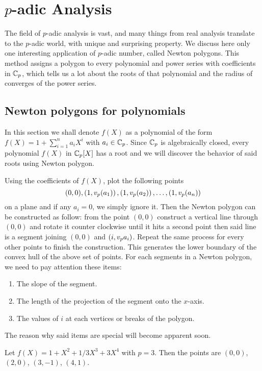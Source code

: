 \chapter{$p$-adic Analysis}
The field of $p$-adic analysis is vast, and many things from real analysis translate to the $p$-adic world, with unique and surprising property.
We discuss here only one interesting application of $p$-adic number, called Newton polygons. 
This method assigns a polygon to every polynomial and power series with coefficients in $\mathbb{C}_p$, which tells us a lot about the roots of that polynomial and the radius of converges of the power series.
\section{Newton polygons for polynomials}
In this section we shall denote $f(X)$ as a polynomial of the form $f(X) = 1 + \sum_{i=1}^{n} a_i X^i$ with $a_i \in \mathbb{C}_p$. Since $\mathbb{C}_p$ is algebraically closed, every polynomial $f(X)$ in $\mathbb{C}_p[X]$ has a root and we will discover the behavior of said roots using Newton polygon.

Using the coefficients of $f(X)$, plot the following points 
\[(0,0), \left(1, v_p{(a_1)}\right), \left(1, v_p{(a_2)}\right),\dots,\left(1, v_p{(a_n)}\right)\] 
on a plane and if any $a_i = 0$, we simply ignore it. Then the Newton polygon can be constructed as follow: from the point $(0, 0)$ construct a vertical line through $(0, 0)$ and rotate it counter clockwise until it hits a second point then said line is a segment joining $(0, 0)$ and $(i, v_p{a_i})$. 
Repeat the same process for every other points to finish the construction. 
This generates the lower boundary of the convex hull of the above set of points.
For each segments in a Newton polygon, we need to pay attention these items:
\begin{enumerate}
    \item The slope of the segment.
    \item The length of the projection of the segment onto the $x$-axis.
    \item The values of $i$ at each vertices or breaks of the polygon.
\end{enumerate}
The reason why said items are special will become apparent soon. 
\begin{example} Let $f(X) = 1 + X^2 + 1/3 X^3 + 3X^4$ with $p = 3$. Then the points are $(0,0)$, $(2,0)$, $(3, -1)$, $(4, 1)$. 
\end{example}

